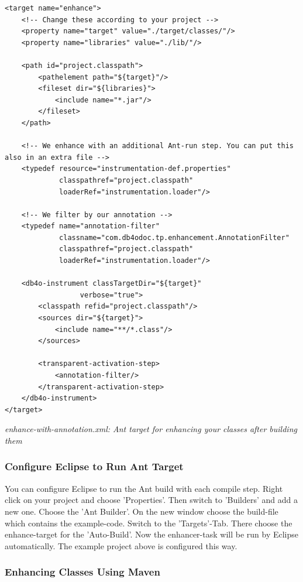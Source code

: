 \begin{lstlisting}
<target name="enhance">
    <!-- Change these according to your project -->
    <property name="target" value="./target/classes/"/>
    <property name="libraries" value="./lib/"/>

    <path id="project.classpath">
        <pathelement path="${target}"/>
        <fileset dir="${libraries}">
            <include name="*.jar"/>
        </fileset>
    </path>

    <!-- We enhance with an additional Ant-run step. You can put this also in an extra file -->
    <typedef resource="instrumentation-def.properties"
             classpathref="project.classpath"
             loaderRef="instrumentation.loader"/>

    <!-- We filter by our annotation -->
    <typedef name="annotation-filter"
             classname="com.db4odoc.tp.enhancement.AnnotationFilter"
             classpathref="project.classpath"
             loaderRef="instrumentation.loader"/>

    <db4o-instrument classTargetDir="${target}"
                  verbose="true">
        <classpath refid="project.classpath"/>
        <sources dir="${target}">
            <include name="**/*.class"/>
        </sources>

        <transparent-activation-step>
            <annotation-filter/>
        </transparent-activation-step>
    </db4o-instrument>
</target>
\end{lstlisting}

{\small\itshape enhance-with-annotation.xml: Ant target for enhancing your classes after building them\par}
\medskip

\subsubsection*{Configure Eclipse to Run Ant Target}

You can configure Eclipse to run the Ant build with each compile step. Right click on your project and choose 'Properties'. Then switch to 'Builders' and add a new one. Choose the 'Ant Builder'. On the new window choose the build-file which contains the example-code. Switch to the 'Targets'-Tab. There choose the enhance-target for the 'Auto-Build'. Now the enhancer-task will be run by Eclipse automatically. The example project above is configured this way.

\subsubsection*{Enhancing Classes Using Maven}

